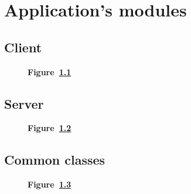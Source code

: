 \chapter{Application's modules}\label{ch:modules}

\begin{landscape}
	\section{Client}\label{sec:client}

	\begin{figure}[!h]
		\caption*{\textbf{Figure~\ref{fig:client}}}
		\captionlistentry{}
		\label{fig:client}
	\end{figure}
\end{landscape}

\begin{landscape}
	\section{Server}\label{sec:server}

	\begin{figure}[!h]
		\caption*{\textbf{Figure~\ref{fig:server}}}
		\captionlistentry{}
		\label{fig:server}
	\end{figure}
\end{landscape}

\begin{landscape}
	\section{Common classes}\label{sec:common}

	\begin{figure}[!h]
		\caption*{\textbf{Figure~\ref{fig:common}}}
		\captionlistentry{}
		\label{fig:common}
	\end{figure}
\end{landscape}
